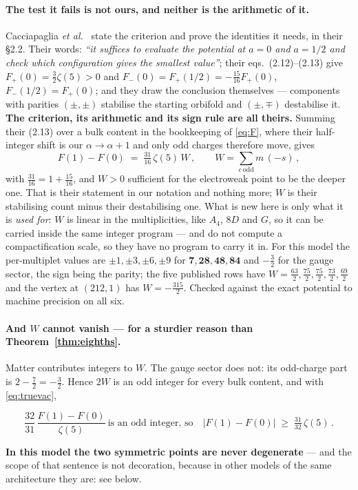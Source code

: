 \documentclass[11pt,a4paper]{article}
\newcommand{\rep}[1]{\mathbf{#1}}
\newenvironment{keyeq}
  {\begin{center}\setlength{\fboxsep}{9pt}\setlength{\fboxrule}{0.8pt}%
   \begin{lrbox}{\keyeqbox}\begin{minipage}{0.88\textwidth}}
  {\end{minipage}\end{lrbox}%
   \fcolorbox{hdrblue!55}{hdrblue!6}{\usebox{\keyeqbox}}\end{center}}
\begin{document}
\paragraph{The test it fails is not ours, and neither is the arithmetic of it.} Cacciapaglia
\emph{et al.}~\cite{CCD24} state the criterion and prove the identities it needs, in their
\S2.2. Their words: \emph{``it suffices to evaluate the potential at $a=0$ and $a=1/2$ and check
which configuration gives the smallest value''}; their eqs.~(2.12)--(2.13) give
$F_+(0)=\tfrac32\zeta(5)>0$ and $F_-(0)=F_+(1/2)=-\tfrac{15}{16}F_+(0)$, $F_-(1/2)=F_+(0)$; and
they draw the conclusion themselves --- components with parities $(\pm,\pm)$ stabilise the
starting orbifold and $(\pm,\mp)$ destabilise it. \textbf{The criterion, its arithmetic and its
sign rule are all theirs.} Summing their (2.13) over a bulk content in the bookkeeping of
\eqref{eq:F}, where their half-integer shift is our $\alpha\to\alpha+1$ and only odd charges
therefore move, gives
\begin{equation}\label{eq:truevac}
  F(1)-F(0)\;=\;\tfrac{31}{16}\,\zeta(5)\,W\,,\qquad W=\sum_{c\ \mathrm{odd}} m\,(-s)\,,
\end{equation}
with $\tfrac{31}{16}=1+\tfrac{15}{16}$, and $W>0$ sufficient for the electroweak point to be the
deeper one. That is their statement in our notation and nothing more; $W$ is their stabilising
count minus their destabilising one. What is new here is only what it is \emph{used for}: $W$ is
linear in the multiplicities, like $A_4$, $8D$ and $G$, so it can be carried inside the same
integer program --- and \cite{CCD24} do not compute a compactification scale, so they have no
program to carry it in. For this model the per-multiplet values are $\pm1,\pm3,\pm6,\pm9$ for
$\rep7,\rep{28},\rep{48},\rep{84}$ and $-\tfrac32$ for the gauge sector, the sign being the parity;
the five published rows have $W=\tfrac{63}{2},\tfrac{75}{2},\tfrac{75}{2},\tfrac{73}{2},\tfrac{69}{2}$
and the vertex at $(212,1)$ has $W=-\tfrac{315}{2}$. Checked
against the exact potential to machine precision on all six.

\paragraph{And $W$ cannot vanish --- for a sturdier reason than Theorem~\ref{thm:eighths}.} Matter
contributes integers to $W$. The gauge sector does not: its odd-charge part is
$2-\tfrac72=-\tfrac32$. Hence $2W$ is an odd integer for every bulk content, and with
\eqref{eq:truevac},
\begin{keyeq}
\begin{equation}\label{eq:nevermarginal}
  \frac{32}{31}\,\frac{F(1)-F(0)}{\zeta(5)}\ \text{is an odd integer, so}\quad
  |F(1)-F(0)|\;\ge\;\tfrac{31}{32}\,\zeta(5)\,.
\end{equation}
\end{keyeq}
\noindent \textbf{In this model the two symmetric points are never degenerate} --- and the scope of
that sentence is not decoration, because in other models of the same architecture they are: see
below.
\end{document}
